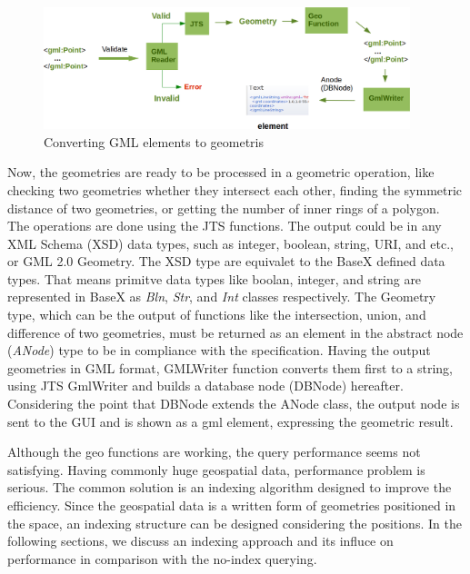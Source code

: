 \documentclass[a4paper,12pt]{article}
\begin{document}
 \begin{figure}
\centering
\includegraphics[width=0.95\textwidth]{GeoModuleProcess}
\caption{Converting GML elements to geometris}
\label{figGeoModuleProcess}
\end{figure}

Now, the geometries are ready to be processed in a geometric operation, like checking two geometries whether they intersect each other, finding the symmetric distance of two geometries, or getting the number of inner rings of a polygon. The operations are done using the JTS functions. The output could be in any XML Schema (XSD) data types, such as integer, boolean, string, URI, and etc., or GML 2.0 Geometry. The XSD type are equivalet to the BaseX defined data types. That means primitve data types like boolan, integer, and string are represented in BaseX as \textit{Bln}, \textit{Str}, and \textit{Int} classes respectively. The Geometry type, which can be the output of functions like the intersection, union, and difference of two geometries, must be returned as an element in the abstract node (\textit{ANode}) type to be in compliance with the specification. Having the output geometries in GML format, GMLWriter function converts them first to a string, using JTS GmlWriter and builds a database node (DBNode) hereafter. Considering the point that DBNode extends the ANode class, the output node is sent to the GUI and is shown as a gml element, expressing the geometric result. 

Although the geo functions are working, the query performance seems not satisfying. Having commonly huge geospatial data, performance problem is serious. The common solution is an indexing algorithm designed to improve the efficiency. Since the geospatial data is a written form of geometries positioned in the space, an indexing structure can be designed considering the positions. In the following sections, we discuss an indexing approach and its influce on performance in comparison with the no-index querying.
\end{document}
